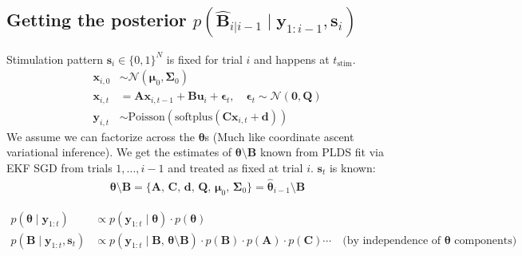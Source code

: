 \documentclass[11pt,letterpaper]{article} %
\begin{document}
\subsection*{Getting the posterior $p(\hat{\bm{B}}_{i|i-1} \mid \bm{y}_{1:i-1}, \bm{s}_{i})$}
Stimulation pattern $\bm{s}_i \in \{0,1\}^N$ is fixed for trial $i$ and happens at $t_{\mathrm{stim}}$.
\begin{align*}
    \bm{x}_{i,0} &\sim \mathcal{N}(\boldsymbol{\mu}_0, \boldsymbol{\Sigma}_0) \\
    \bm{x}_{i, t} &= \bm{A}\bm{x}_{i, t-1} + \bm{B}\bm{u}_i + \boldsymbol{\epsilon}_t, \quad \boldsymbol{\epsilon}_t \sim \mathcal{N}(\bm{0}, \bm{Q}) \\
    \bm{y}_{i, t} &\sim \text{Poisson}\!\left(\text{softplus}\!\left(\bm{C}\bm{x}_{i, t} + \bm{d}\right)\right)
\end{align*}
We assume we can factorize across the $\boldsymbol{\theta}$s (Much like coordinate ascent variational inference). We get the estimates of $\boldsymbol{\theta} \setminus \bm{B}$ known from PLDS fit via EKF SGD from trials $1, \ldots, i-1$ and treated as fixed at trial $i$. $\bm{s}_{t}$ is known:
\begin{align*}
    \boldsymbol{\theta} \setminus \bm{B} = \{\bm{A},\,\bm{C},\,\bm{d},\,
    \bm{Q},\,\boldsymbol{\mu}_0,\,\boldsymbol{\Sigma}_0\}
    = \hat{\boldsymbol{\theta}}_{i-1} \setminus \bm{B}
\end{align*}

\begin{align*}
    p(\boldsymbol{\theta} \mid \bm{y}_{1:t})
        &\propto p(\bm{y}_{1:t} \mid \boldsymbol{\theta}) \cdot p(\boldsymbol{\theta}) \\
    p(\bm{B} \mid \bm{y}_{1:t}, \bm{s}_{t})
        &\propto p(\bm{y}_{1:t} \mid \bm{B},\, \boldsymbol{\theta} \setminus \bm{B}) \cdot
                 p(\bm{B}) \cdot p(\bm{A}) \cdot p(\bm{C}) \cdots
                 \quad \text{(by independence of } \boldsymbol{\theta} \text{ components)}
\end{align*}
\end{document}
